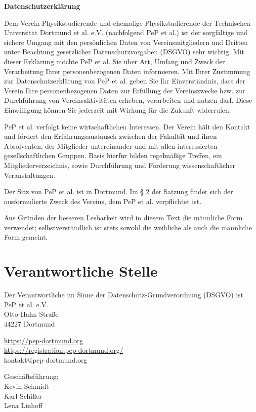 \documentclass[
  fontsize=12pt,
  paper=a4,
  DIV14,
  parskip,
]{scrartcl}
\begin{document}
\textbf{\huge Datenschutzerklärung}

Dem Verein Physikstudierende und ehemalige Physikstudierende der Technischen
Universität Dortmund et al. e.V. (nachfolgend PeP et al.) ist der sorgfältige
und sichere Umgang mit den persönlichen Daten von Vereinsmitgliedern und
Dritten unter Beachtung gesetzlicher Datenschutzvorgaben (DSGVO) sehr
wichtig.
Mit dieser Erklärung möchte PeP et al. Sie über Art, Umfang und Zweck der
Verarbeitung Ihrer personenbezogenen Daten informieren.
Mit Ihrer Zustimmung zur Datenschutzerklärung von PeP et al. geben Sie Ihr
Einverständnis, dass der Verein Ihre personenbezogenen Daten zur Erfüllung
der Vereinszwecke bzw. zur Durchführung von Vereinsaktivitäten erheben,
verarbeiten und nutzen darf.
Diese Einwilligung können Sie jederzeit mit Wirkung für die Zukunft
widerrufen.

PeP et al. verfolgt keine wirtschaftlichen Interessen. Der Verein hält den
Kontakt und fördert den Erfahrungsaustausch zwischen der Fakultät und ihren
Absolventen, der Mitglieder untereinander und mit allen interessierten
gesellschaftlichen Gruppen.
Basis hierfür bilden regelmäßige Treffen, ein Mitgliederverzeichnis, sowie
Durchführung und Förderung wissenschaftlicher Veranstaltungen.

Der Sitz von PeP et al. ist in Dortmund. Im § 2 der Satzung findet sich der
ausformulierte Zweck des Vereins, dem PeP et al. verpflichtet ist.

Aus Gründen der besseren Lesbarkeit wird in diesem Text die männliche Form
verwendet; selbstverständlich ist stets sowohl die weibliche als auch die
männliche Form gemeint.

\section*{Verantwortliche Stelle}

Der Verantwortliche im Sinne der Datenschutz-Grundverordnung (DSGVO) ist\\
PeP et al. e.V.\\
Otto-Hahn-Straße\\
44227 Dortmund

\url{https://pep-dortmund.org}\\
\url{https://registration.pep-dortmund.org/}\\
kontakt@pep-dortmund.org

Geschäftsführung:\\
Kevin Schmidt\\
Karl Schiller\\
Lena Linhoff\\
\end{document}
